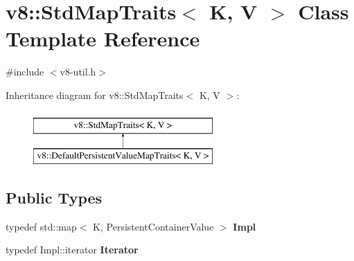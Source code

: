 \hypertarget{classv8_1_1StdMapTraits}{}\section{v8\+:\+:Std\+Map\+Traits$<$ K, V $>$ Class Template Reference}
\label{classv8_1_1StdMapTraits}


{\ttfamily \#include $<$v8-\/util.\+h$>$}

Inheritance diagram for v8\+:\+:Std\+Map\+Traits$<$ K, V $>$\+:\begin{figure}[H]
\begin{center}
\leavevmode
\includegraphics[height=2.000000cm]{classv8_1_1StdMapTraits}
\end{center}
\end{figure}
\subsection*{Public Types}
\begin{DoxyCompactItemize}
\item 
\hypertarget{classv8_1_1StdMapTraits_ac64cb78b3ef5cfbc35cf03837552e4ea}{}typedef std\+::map$<$ K, Persistent\+Container\+Value $>$ {\bfseries Impl}\label{classv8_1_1StdMapTraits_ac64cb78b3ef5cfbc35cf03837552e4ea}

\item 
\hypertarget{classv8_1_1StdMapTraits_ad20ef2022e83bfba6dcee23a2a34098e}{}typedef Impl\+::iterator {\bfseries Iterator}\label{classv8_1_1StdMapTraits_ad20ef2022e83bfba6dcee23a2a34098e}

\end{DoxyCompactItemize}
